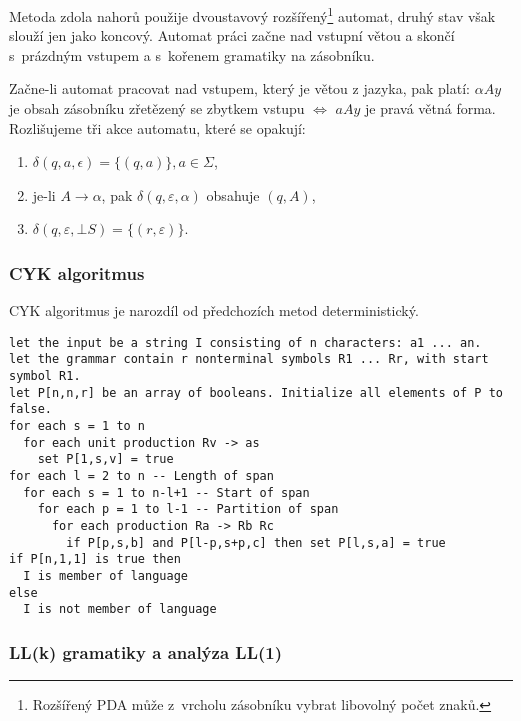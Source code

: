 \begin{example}

\end{example}

Metoda zdola nahorů použije dvoustavový rozšířený\footnote{Rozšířený
PDA může z~vrcholu zásobníku vybrat libovolný počet znaků.} automat, druhý
stav však slouží jen jako koncový. Automat práci začne
nad vstupní větou a skončí s~prázdným vstupem a s~kořenem gramatiky na
zásobníku.

Začne-li automat pracovat nad vstupem, který je větou z jazyka, pak
platí: $\alpha A y$ je obsah zásobníku zřetězený se zbytkem vstupu
$\iff$ $a A y$ je pravá větná forma. Rozlišujeme tři akce automatu,
které se opakují:
\begin{enumerate}
    \item $\delta(q, a, \epsilon) = \{ (q, a) \}, a \in \Sigma$,
    \item je-li $A \to \alpha$, pak $\delta(q, \varepsilon, \alpha)$
        obsahuje $(q, A)$,
    \item $\delta(q, \varepsilon, \bot S) = \{ (r, \varepsilon) \}$.
\end{enumerate}

\begin{example}
\end{example}

\pagebreak

\subsubsection{CYK algoritmus}

CYK algoritmus je narozdíl od předchozích metod deterministický.

\begin{Verbatim}[fontsize=\small]
let the input be a string I consisting of n characters: a1 ... an.
let the grammar contain r nonterminal symbols R1 ... Rr, with start symbol R1.
let P[n,n,r] be an array of booleans. Initialize all elements of P to false.
for each s = 1 to n
  for each unit production Rv -> as
    set P[1,s,v] = true
for each l = 2 to n -- Length of span
  for each s = 1 to n-l+1 -- Start of span
    for each p = 1 to l-1 -- Partition of span
      for each production Ra -> Rb Rc
        if P[p,s,b] and P[l-p,s+p,c] then set P[l,s,a] = true
if P[n,1,1] is true then
  I is member of language
else
  I is not member of language
\end{Verbatim}

\subsubsection{LL(k) gramatiky a analýza LL(1)}

